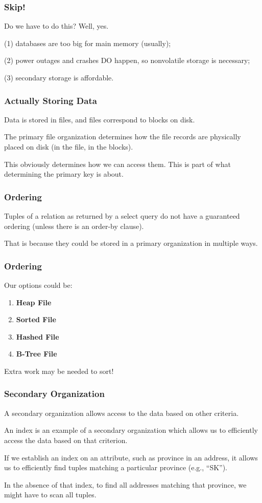 \begin{frame}
\frametitle{Skip!}

Do we have to do this? Well, yes. 

(1) databases are too big for main memory (usually); 

(2) power outages and crashes DO happen, so nonvolatile storage is necessary; 

(3) secondary storage is affordable.


\end{frame}


\begin{frame}
\frametitle{Actually Storing Data}

Data is stored in files, and files correspond to blocks on disk. 

The \alert{primary file organization} determines how the file records are physically placed on disk (in the file, in the blocks). 

This obviously determines how we can access them. This is part of what determining the primary key is about. 

\end{frame}


\begin{frame}
\frametitle{Ordering}

Tuples of a relation as returned by a select query do not have a guaranteed ordering (unless there is an order-by clause). 

That is because they could be stored in a primary organization in multiple ways. 

\end{frame}


\begin{frame}
\frametitle{Ordering}
Our options could be:

\begin{enumerate}
	\item \textbf{Heap File}
	\item \textbf{Sorted File}
	\item \textbf{Hashed File}
	\item \textbf{B-Tree File}
\end{enumerate}

Extra work may be needed to sort!

\end{frame}



\begin{frame}
\frametitle{Secondary Organization}

A \alert{secondary organization} allows access to the data based on other criteria. 

An index is an example of a secondary organization which allows us to efficiently access the data based on that criterion. 

If we establish an index on an attribute, such as province in an address, it allows us to efficiently find tuples matching a particular province (e.g., ``SK'').

In the absence of that index, to find all addresses matching that province, we might have to scan all tuples.

\end{frame}


